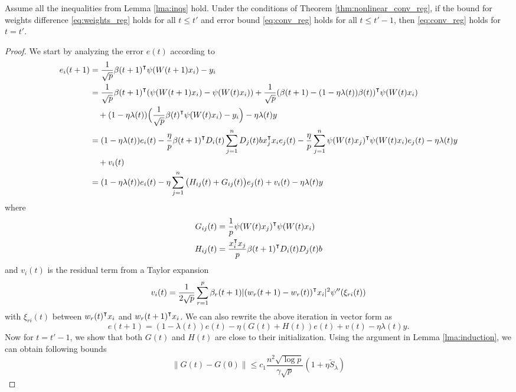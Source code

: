 \begin{lemma}
\label{lma:induction_reg}
Assume all the inequalities from Lemma \ref{lma:inqs} hold. Under the conditions of Theorem \ref{thm:nonlinear_conv_reg}, if the bound for weights difference \eqref{eq:weights_reg} holds for all $t\leq t'$ and error bound \eqref{eq:conv_reg} holds for all $t\leq t'-1$, then \eqref{eq:conv_reg} holds for $t=t'$.
\end{lemma}
\begin{proof}
We start by analyzing the error $e(t)$ according to 
\begin{equation*}
\begin{aligned}
    e_i(t+1)
    &= \frac{1}{\sqrt p}\beta(t+1)\transpose\psi(W(t+1)x_i) - y_i \\
    &= \frac{1}{\sqrt p}\beta(t+1)\transpose(\psi(W(t+1)x_i)-\psi(W(t)x_i))+ \frac{1}{\sqrt p}(\beta(t+1)-(1-\eta\lambda(t))\beta(t))\transpose \psi(W(t)x_i) \\
    & \quad + (1-\eta\lambda(t))\Big(\frac{1}{\sqrt p}\beta(t)\transpose \psi(W(t)x_i) - y_i\Big) - \eta\lambda(t)y \\
    &=(1-\eta\lambda(t))e_i(t) - \frac{\eta}{p}\beta(t+1)\transpose D_i(t)\sum_{j=1}^nD_j(t)b x_j\transpose x_i e_j(t)  - \frac{\eta}{p}\sum_{j=1}^n\psi(W(t)x_j)\transpose\psi(W(t)x_i)e_j(t) - \eta\lambda(t)y\\
    & \quad + v_i(t) \\
    & = (1-\eta\lambda(t))e_i(t)-\eta\sum_{j=1}^n\big(H_{ij}(t)+G_{ij}(t)\big)e_j(t) + v_i(t) - \eta\lambda(t)y
\end{aligned}
\end{equation*}
where
\begin{equation*}
\begin{aligned}
G_{ij}(t) &= \frac{1}{p}\psi(W(t)x_j)\transpose\psi(W(t)x_i) \\
H_{ij}(t) &= \frac{x_i\transpose x_j}{p}\beta(t+1)\transpose D_i(t)D_j(t)b
\end{aligned}
\end{equation*}
and $v_i(t)$ is the residual term from a Taylor expansion
\begin{equation*}
    v_i(t) = \frac{1}{2\sqrt p}\sum_{r=1}^p\beta_r(t+1)|(w_r(t+1)-w_r(t))\transpose x_i|^2\psi''(\xi_{ri}(t))
\end{equation*}
with $\xi_{ri}(t)$ between $w_r(t)\transpose x_i$ and $w_r(t+1)\transpose x_i$. We can also rewrite the above iteration in vector form as
\begin{equation}\label{eq:et_iter_reg}
     e(t+1) = (1-\lambda(t))e(t) - \eta(G(t)+H(t))e(t) + v(t) -\eta\lambda(t)y.
\end{equation}
Now for $t=t'-1$, we show that both $G(t)$ and $H(t)$ are close to their initialization. Using the argument in Lemma \ref{lma:induction}, we can obtain following bounds
\begin{equation}\label{eq:bound_Gt_reg}
    \|G(t)-G(0)\| \leq c_1 \frac{n^2\sqrt{\log p}}{\gamma\sqrt p}(1+\eta \tilde{S}_\lambda)
\end{equation}


\end{proof}

